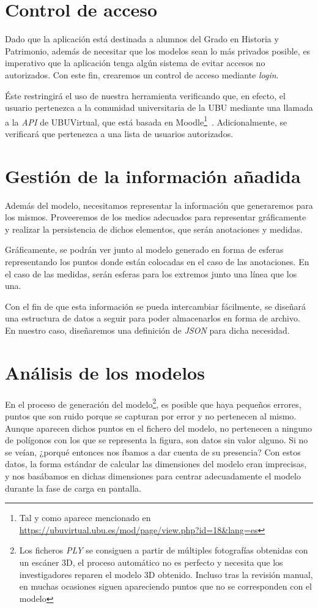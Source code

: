 \section{Control de acceso}
Dado que la aplicación está destinada a alumnos del Grado en Historia y Patrimonio, además de necesitar que los modelos sean lo más privados posible, es imperativo que la aplicación tenga algún sistema de evitar accesos no autorizados. Con este fin, crearemos un control de acceso mediante \textit{login}.

Éste restringirá el uso de nuestra herramienta verificando que, en efecto, el usuario pertenezca a la comunidad universitaria de la UBU mediante una llamada a la \textit{API} de UBUVirtual, que está basada en Moodle\footnote{Tal y como aparece mencionado en \url{https://ubuvirtual.ubu.es/mod/page/view.php?id=18&lang=es}}~\cite{github:moodle}. Adicionalmente, se verificará que pertenezca a una lista de usuarios autorizados.

\section{Gestión de la información añadida}
Además del modelo, necesitamos representar la información que generaremos para los mismos. Proveeremos de los medios adecuados para representar gráficamente y realizar la persistencia de dichos elementos, que serán anotaciones y medidas.

Gráficamente, se podrán ver junto al modelo generado en forma de esferas representando los puntos donde están colocadas en el caso de las anotaciones. En el caso de las medidas, serán esferas para los extremos junto una línea que los una.

Con el fin de que esta información se pueda intercambiar fácilmente, se diseñará una estructura de datos a seguir para poder almacenarlos en forma de archivo. En nuestro caso, diseñaremos una definición de \textit{JSON} para dicha necesidad.


\section{Análisis de los modelos}\label{sec:analisis-modelos}
En el proceso de generación del modelo\footnote{Los ficheros \textit{PLY} se consiguen a partir de múltiples fotografías obtenidas con un escáner 3D, el proceso automático no es perfecto y necesita que los investigadores reparen el modelo 3D obtenido. Incluso tras la revisión manual, en muchas ocasiones siguen apareciendo puntos que no se corresponden con el modelo}, es posible que haya pequeños errores, puntos que son ruido porque se capturan por error y no pertenecen al mismo. Aunque aparecen dichos puntos en el fichero del modelo, no pertenecen a ninguno de polígonos con los que se representa la figura, son datos sin valor alguno. Si no se veían, ¿porqué entonces nos íbamos a dar cuenta de su presencia? Con estos datos, la forma estándar de calcular las dimensiones del modelo eran imprecisas, y nos basábamos en dichas dimensiones para centrar adecuadamente el modelo durante la fase de carga en pantalla.

